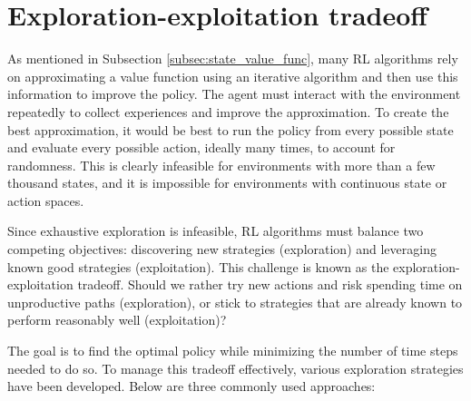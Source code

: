 \documentclass[
  digital,     %
  oneside,     %
  nosansbold,  %
  nocolorbold, %
  lof,         %
  lot,         %
]{fithesis4}
\begin{document}
\section{Exploration-exploitation tradeoff}
\label{sec:explor-exploit}
As mentioned in Subsection \ref{subsec:state_value_func}, many RL algorithms rely on approximating a value function using an iterative algorithm and then use this information to improve the policy. The agent must interact with the environment repeatedly to collect experiences and improve the approximation. To create the best approximation, it would be best to run the policy from every possible state and evaluate every possible action, ideally many times, to account for randomness. This is clearly infeasible for environments with more than a few thousand states, and it is impossible for environments with continuous state or action spaces.

Since exhaustive exploration is infeasible, RL algorithms must balance two competing objectives: discovering new strategies (exploration) and leveraging known good strategies (exploitation). This challenge is known as the exploration-exploitation tradeoff. Should we rather try new actions and risk spending time on unproductive paths (exploration), or stick to strategies that are already known to perform reasonably well (exploitation)?

The goal is to find the optimal policy while minimizing the number of time steps needed to do so. To manage this tradeoff effectively, various exploration strategies have been developed. Below are three commonly used approaches:
\end{document}
